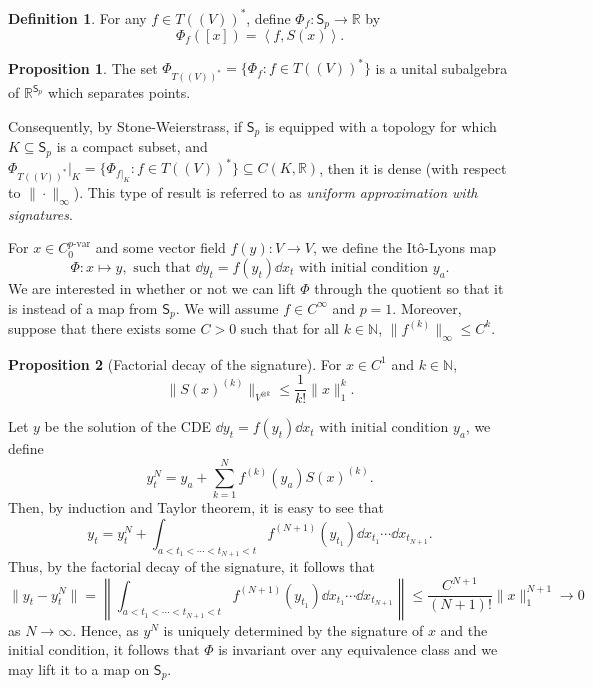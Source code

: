 \documentclass[]{article}
\theoremstyle{definition}
\theoremstyle{definition}
\newtheorem{definition}{Definition}
\newtheorem{proposition}{Proposition}[section]
\def\<{\left\langle}
\def\>{\right\rangle}
\newcommand{\pvar}{{p\text{-var}}}
\begin{document}
\begin{definition}
  For any \(f \in T((V))^*\), define \(\Phi_f : \mathsf{S}_p \to \mathbb{R}\) by 
  \[\Phi_f([x]) = \<f, S(x)\>.\]
\end{definition}

\begin{proposition}
  The set \(\Phi_{T((V))^*} = \{\Phi_f : f \in T((V))^*\}\) is a unital subalgebra of \(\mathbb{R}^{\mathsf{S}_p}\) 
  which separates points.
\end{proposition}

Consequently, by Stone-Weierstrass, if \(\mathsf{S}_p\) is equipped with a topology for which 
\(K \subseteq \mathsf{S}_p\) is a compact subset, and \(\Phi_{T((V))^*}|_K = \{\Phi_{f|_K} : f \in T((V))^*\} 
\subseteq C(K, \mathbb{R})\), then it is dense (with respect to \(\|\cdot\|_\infty\)). 
This type of result is referred to as \textit{uniform approximation with signatures}.

For \(x \in C^\pvar_0\) and some vector field \(f(y) : V \to V\), we define the It\^o-Lyons map 
\[\Phi : x \mapsto y, \text{ such that } \dd y_t = f(y_t) \dd x_t \text{ with initial condition } y_a.\]
We are interested in whether or not we can lift \(\Phi\) through the quotient so that it is instead 
of a map from \(\mathsf{S}_p\). We will assume \(f \in C^\infty\) and \(p = 1\). Moreover, 
suppose that there exists some \(C > 0\) such that for all \(k \in \mathbb{N}\), 
\(\|f^{(k)}\|_\infty \le C^k\).

\begin{proposition}[Factorial decay of the signature]
  For \(x \in C^1\) and \(k \in \mathbb{N}\),
  \[\|S(x)^{(k)}\|_{V^{\otimes k}} \le \frac{1}{k!}\|x\|_1^k.\]  
\end{proposition}

Let \(y\) be the solution of the CDE \(\dd y_t = f(y_t) \dd x_t \text{ with initial condition } y_a\),
we define 
\[y^N_t = y_a + \sum_{k = 1}^N f^{(k)}(y_a) S(x)^{(k)}.\]
Then, by induction and Taylor theorem, it is easy to see that 
\[y_t = y_t^N + \int_{a < t_1 < \cdots < t_{N + 1} < t}f^{(N + 1)}(y_{t_1}) \dd x_{t_1} \cdots \dd x_{t_{N + 1}}.\]
Thus, by the factorial decay of the signature, it follows that
\[\|y_t - y_t^N\| 
  = \left\|\int_{a < t_1 < \cdots < t_{N + 1} < t}f^{(N + 1)}(y_{t_1}) \dd x_{t_1} \cdots \dd x_{t_{N + 1}}\right\|
  \le \frac{C^{N + 1}}{(N + 1)!}\|x\|^{N + 1}_1 \to 0\]
as \(N \to \infty\). Hence, as \(y^N\) is uniquely determined by the signature of \(x\) and the 
initial condition, it follows that \(\Phi\) is invariant over any equivalence class and we may lift it 
to a map on \(\mathsf{S}_p\).
\end{document}
